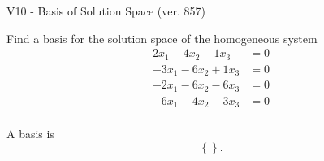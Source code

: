 \begin{exercise}
  \begin{exerciseTitle}V10 - Basis of Solution Space (ver. 857)\end{exerciseTitle}
  \begin{exerciseStatement}
    Find a basis for the solution space of the homogeneous system 
\begin{align*}
 2 x_ 1 -4 x_ 2 -1 x_ 3 &= 0  \\ 
  -3 x_ 1 -6 x_ 2 + 1 x_ 3 &= 0  \\ 
  -2 x_ 1 -6 x_ 2 -6 x_ 3 &= 0  \\ 
  -6 x_ 1 -4 x_ 2 -3 x_ 3 &= 0  \\ 
 \end{align*}


 
  \end{exerciseStatement}

  \begin{exerciseAnswer}
   A basis is   
\[\left\{\right\}.\]

  


  \end{exerciseAnswer}
\end{exercise}